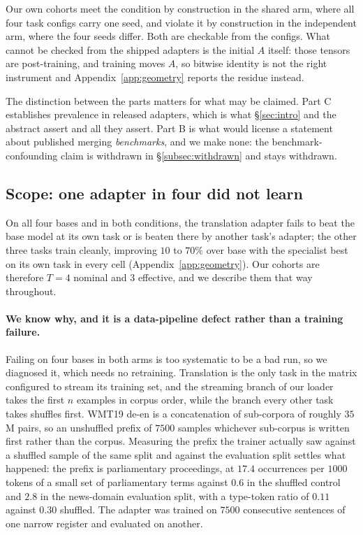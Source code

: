 Our own cohorts meet the condition by construction in the shared arm, where
all four task configs carry one seed, and violate it by construction in the
independent arm, where the four seeds differ. Both are checkable from the
configs. What cannot be checked from the shipped adapters is the initial $A$
itself: those tensors are post-training, and training moves $A$, so bitwise
identity is not the right instrument and Appendix~\ref{app:geometry} reports
the residue instead.

The distinction between the parts matters for what may be claimed. Part C
establishes prevalence in released adapters, which is what \S\ref{sec:intro}
and the abstract assert and all they assert. Part B is what would license a
statement about published merging \emph{benchmarks}, and we make none: the
benchmark-confounding claim is withdrawn in \S\ref{subsec:withdrawn} and stays
withdrawn.

\subsection{Scope: one adapter in four did not learn}
\label{subsec:scope}

On all four bases and in both conditions, the translation adapter fails to
beat the base model at its own task or is beaten there by another task's
adapter; the other three tasks train cleanly, improving $10$ to $70\%$ over
base with the specialist best on its own task in every cell
(Appendix~\ref{app:geometry}). Our cohorts are therefore $T=4$ nominal and
$3$ effective, and we describe them that way throughout.

\paragraph{We know why, and it is a data-pipeline defect rather than a
training failure.} Failing on four bases in both arms is too systematic to
be a bad run, so we diagnosed it, which needs no retraining. Translation is
the only task in the matrix configured to stream its training set, and the
streaming branch of our loader takes the first $n$ examples in corpus
order, while the branch every other task takes shuffles first. WMT19 de-en
is a concatenation of sub-corpora of roughly $35$M pairs, so an unshuffled
prefix of $7500$ samples whichever sub-corpus is written first rather than
the corpus. Measuring the prefix the trainer actually saw against a
shuffled sample of the same split and against the evaluation split settles
what happened: the prefix is parliamentary proceedings, at $17.4$
occurrences per $1000$ tokens of a small set of parliamentary terms against
$0.6$ in the shuffled control and $2.8$ in the news-domain evaluation
split, with a type-token ratio of $0.11$ against $0.30$ shuffled. The
adapter was trained on $7500$ consecutive sentences of one narrow register
and evaluated on another.

